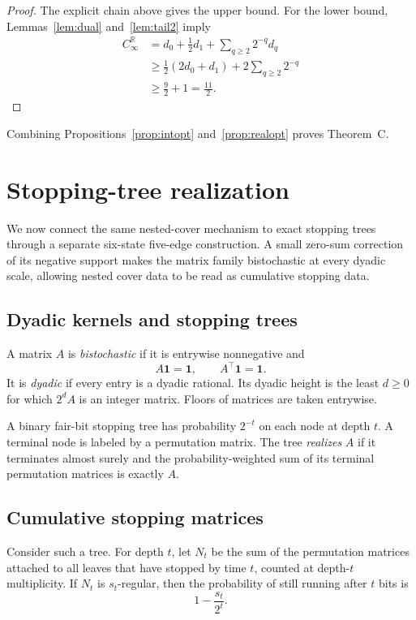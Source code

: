 \documentclass[11pt]{article}
\theoremstyle{definition}
\newcommand{\one}{\mathbf 1}
\newcommand{\R}{\mathbb R}
\begin{document}
\begin{proof}
The explicit chain above gives the upper bound.
For the lower bound, Lemmas~\ref{lem:dual} and~\ref{lem:tail2} imply
\[
\begin{aligned}
C_\infty^\R
&=
d_0+\frac12d_1+\sum_{q\ge2}2^{-q}d_q\\
&\ge
\frac12(2d_0+d_1)
+
2\sum_{q\ge2}2^{-q}\\
&\ge
\frac92+1
=
\frac{11}{2}.
\end{aligned}
\]
\end{proof}

Combining Propositions~\ref{prop:intopt} and~\ref{prop:realopt} proves Theorem~C.

\section{Stopping-tree realization}
\label{sec:stopping}

We now connect the same nested-cover mechanism to exact stopping trees through a separate
six-state five-edge construction.  A small zero-sum correction of its negative support makes the
matrix family bistochastic at every dyadic scale, allowing nested cover data to be read as
cumulative stopping data.

\subsection{Dyadic kernels and stopping trees}

A matrix $A$ is \emph{bistochastic} if it is entrywise nonnegative and
\[
A\one=\one,
\qquad
A^\top\one=\one.
\]
It is \emph{dyadic} if every entry is a dyadic rational.  Its dyadic height is the least
$d\ge0$ for which $2^dA$ is an integer matrix.  Floors of matrices are taken entrywise.

A binary fair-bit stopping tree has probability $2^{-t}$ on each node at depth $t$.
A terminal node is labeled by a permutation matrix.  The tree \emph{realizes} $A$ if it
terminates almost surely and the probability-weighted sum of its terminal permutation matrices
is exactly $A$.

\subsection{Cumulative stopping matrices}

Consider such a tree.
For depth $t$, let $N_t$ be the sum of the permutation matrices attached to all leaves that have
stopped by time $t$, counted at depth-$t$ multiplicity.
If $N_t$ is $s_t$-regular, then the probability of still running after $t$ bits is
\[
1-\frac{s_t}{2^t}.
\]
\end{document}
